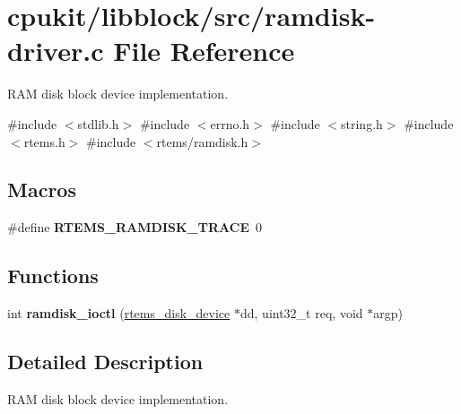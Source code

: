\hypertarget{ramdisk-driver_8c}{}\section{cpukit/libblock/src/ramdisk-\/driver.c File Reference}
\label{ramdisk-driver_8c}


R\+AM disk block device implementation.  


{\ttfamily \#include $<$stdlib.\+h$>$}\newline
{\ttfamily \#include $<$errno.\+h$>$}\newline
{\ttfamily \#include $<$string.\+h$>$}\newline
{\ttfamily \#include $<$rtems.\+h$>$}\newline
{\ttfamily \#include $<$rtems/ramdisk.\+h$>$}\newline
\subsection*{Macros}
\begin{DoxyCompactItemize}
\item 
\mbox{\label{ramdisk-driver_8c_a0de2295e75fb29fe71eb0a62f613bb81}} 
\#define {\bfseries R\+T\+E\+M\+S\+\_\+\+R\+A\+M\+D\+I\+S\+K\+\_\+\+T\+R\+A\+CE}~0
\end{DoxyCompactItemize}
\subsection*{Functions}
\begin{DoxyCompactItemize}
\item 
int {\bfseries ramdisk\+\_\+ioctl} (\mbox{\hyperlink{structrtems__disk__device}{rtems\+\_\+disk\+\_\+device}} $\ast$dd, uint32\+\_\+t req, void $\ast$argp)
\end{DoxyCompactItemize}


\subsection{Detailed Description}
R\+AM disk block device implementation. 

